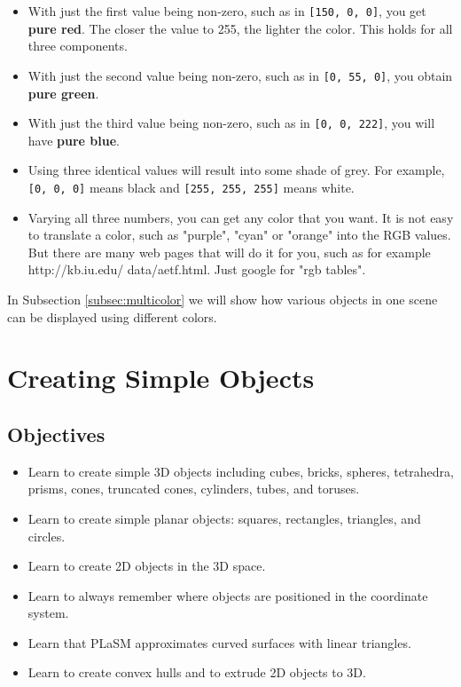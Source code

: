 \begin{itemize}
\item With just the first value being non-zero, such as in {\tt [150, 0, 0]},
      you get {\bf pure red}. The closer the value to 255, the lighter the color.
      This holds for all three components.
\item With just the second value being non-zero, such as in {\tt [0, 55, 0]},
      you obtain {\bf pure green}.
\item With just the third value being non-zero, such as in {\tt [0, 0, 222]},
      you will have {\bf pure blue}. 
\item Using three identical values will result into some shade of grey. For 
      example, {\tt [0, 0, 0]}
      means black and {\tt [255, 255, 255]} means white.
\item Varying all three numbers, you can get any color that you want. It is not 
      easy to translate a color, such as "purple", "cyan" or "orange" into the RGB
      values. But there are many web pages that will do it for you, such as for
      example http://kb.iu.edu/ data/aetf.html. Just google for "rgb tables".
\end{itemize}
In Subsection \ref{subsec:multicolor} we will show how various objects in
one scene can be displayed using different colors.

\section{Creating Simple Objects}

\subsection{Objectives}
\begin{itemize}
\item Learn to create simple 3D objects including cubes, bricks, spheres,  
      tetrahedra, prisms, cones, truncated cones, cylinders, tubes, and toruses. 
\item Learn to create simple planar objects: squares, rectangles, triangles, and circles. 
\item Learn to create 2D objects in the 3D space. 
\item Learn to always remember where objects are positioned in the coordinate system.
\item Learn that PLaSM approximates curved surfaces with linear triangles.
\item Learn to create convex hulls and to extrude 2D objects to 3D.
\end{itemize}
\vspace{4mm}


